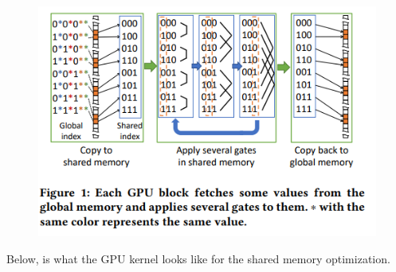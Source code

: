 \documentclass{article}
\begin{document}
\begin{figure}[H]
    \centerline{\includegraphics[width=6in]{sharedmem.png}}
\end{figure}

Below, is what the GPU kernel looks like for the shared memory optimization. 
\end{document}
